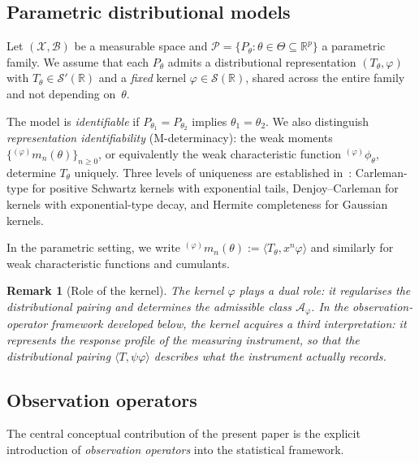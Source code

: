 \documentclass[11pt,a4paper]{article}
\newtheorem{remark}[theorem]{Remark}
\newcommand{\R}{\mathbb{R}}
\begin{document}
\subsection{Parametric distributional models}\label{subsec:parametric}

Let $(\mathcal X, \mathcal B)$ be a measurable space and
$\mathcal P = \{P_\theta : \theta \in \Theta \subseteq \R^p\}$ a parametric
family.  We assume that each $P_\theta$ admits a distributional
representation $(T_\theta, \varphi)$ with $T_\theta \in \mathcal S'(\R)$
and a \emph{fixed} kernel $\varphi \in \mathcal S(\R)$, shared across the
entire family and not depending on~$\theta$.

The model is \emph{identifiable} if $P_{\theta_1} = P_{\theta_2}$ implies
$\theta_1 = \theta_2$.  We also distinguish \emph{representation
identifiability} (M-determinacy): the weak moments
$\{{}^{(\varphi)}m_n(\theta)\}_{n \geq 0}$, or equivalently the weak
characteristic function ${}^{(\varphi)}\phi_\theta$, determine $T_\theta$
uniquely.  Three levels of uniqueness are established
in~\cite{LabouriauA1}: Carleman-type for positive Schwartz kernels with
exponential tails, Denjoy--Carleman for kernels with exponential-type
decay, and Hermite completeness for Gaussian kernels.

In the parametric setting, we write
${}^{(\varphi)}m_n(\theta) := \langle T_\theta, x^n\varphi \rangle$ and
similarly for weak characteristic functions and cumulants.

\begin{remark}[Role of the kernel]\label{rem:kernel-role}
The kernel $\varphi$ plays a dual role: it regularises the distributional
pairing and determines the admissible class $\mathcal A_\varphi$.  In the
observation-operator framework developed below, the kernel acquires a third
interpretation: it represents the response profile of the measuring
instrument, so that the distributional pairing
$\langle T, \psi\varphi \rangle$ describes what the instrument actually
records.
\end{remark}

\subsection{Observation operators}\label{subsec:obs-operators}

The central conceptual contribution of the present paper is the explicit
introduction of \emph{observation operators} into the statistical
framework.
\end{document}
